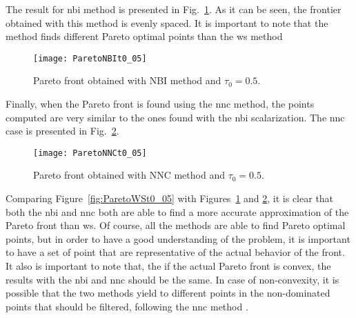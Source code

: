The result for \gls{nbi} method is presented in Fig.~\ref{fig:ParetoNBIt0_05}. As it can be seen, the frontier obtained with this method is evenly spaced. It is important to note that the method finds different Pareto optimal points than the \gls{ws} method
%
\begin{figure}[tb]%
\centering
\texttt{[image: ParetoNBIt0\_05]}%
\caption{Pareto front obtained with NBI method and $\tau_0=0.5$.}%
\label{fig:ParetoNBIt0_05}%
\end{figure}
%

Finally, when the Pareto front is found using the \gls{nnc} method, the points computed are very similar to the ones found with the \gls{nbi} scalarization. The \gls{nnc} case is presented in Fig.~\ref{fig:ParetoNNCt0_05}. 
%
\begin{figure}[tb]%
	\centering
	\texttt{[image: ParetoNNCt0\_05]}%
	\caption{Pareto front obtained with NNC method and $\tau_0=0.5$.}%
	\label{fig:ParetoNNCt0_05}%
\end{figure}
%
Comparing Figure~\ref{fig:ParetoWSt0_05} with Figures~\ref{fig:ParetoNBIt0_05} and \ref{fig:ParetoNNCt0_05}, it is clear that both the \gls{nbi} and \gls{nnc} both are able to find a more accurate approximation of the Pareto front than \gls{ws}. Of course, all the methods are able to find Pareto optimal points, but in order to have a good understanding of the problem, it is important to have a set of point that are representative of the actual behavior of the front. It also is important to note that, the if the actual Pareto front is convex, the results with the \gls{nbi} and \gls{nnc} should be the same. In case of non-convexity, it is possible that the two methods yield to different points in the non-dominated points that should be filtered, following the \gls{nnc} method \cite{Messac2003}.


